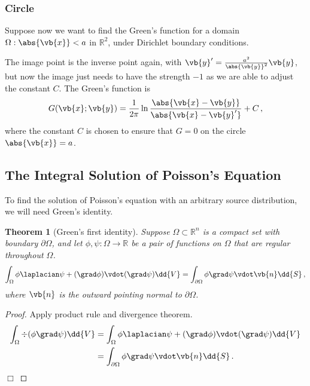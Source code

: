 \documentclass{article}
\theoremstyle{plain}\theoremheaderfont{\normalfont\itshape}\theorembodyfont{\rmfamily}\theoremseparator{.}\newtheorem*{rem}{Remark}\newtheorem*{ex}{Example}\newtheorem*{proof}{Proof}\newtheorem*{altp}{Alternative proof}
\theoremstyle{plain}\theoremheaderfont{\normalfont\bfseries}\theorembodyfont{\rmfamily}\theoremseparator{.}\newtheorem{thm}{Theorem}[section]\newtheorem{lem}[thm]{Lemma}\newtheorem{prop}[thm]{Proposition}\newtheorem*{cor}{Corollary}\newtheorem{defn}[thm]{Definition}\newtheorem{clm}[thm]{Claim}\newtheorem{clminproof}{Claim}
\theoremstyle{break}\theoremheaderfont{\normalfont\itshape}\theorembodyfont{\rmfamily}\theoremseparator{.\medskip}\newtheorem*{proofskip}{Proof}\newtheorem*{exs}{Examples}\newtheorem*{rems}{Remarks}
\theoremstyle{break}\theoremheaderfont{\normalfont\bfseries}\theorembodyfont{\rmfamily}\theoremseparator{.\medskip}\newtheorem{lemskip}[thm]{Lemma}\newtheorem{defnskip}[thm]{Definition}\newtheorem{propskip}[thm]{Proposition}\newtheorem{thmskip}[thm]{Theorem}
\numberwithin{equation}{section}
\newcommand{\qed}{\hfill\ensuremath{\Box}}
\begin{document}
	\subsubsection{Circle}
	Suppose now we want to find the Green's function for a domain \(\Omega:\abs{\vb{x}}<a\) in \(\mathbb{R}^2\), under Dirichlet boundary conditions.

	The image point is the inverse point again, with \(\vb{y}'=\frac{a^2}{\abs{\vb{y}}^2}\vb{y}\), but now the image just needs to have the strength \(-1\) as we are able to adjust the constant \(C\). The Green's function is
	\[G(\vb{x};\vb{y})=\frac{1}{2\pi}\ln\frac{\abs{\vb{x}-\vb{y}}}{\abs{\vb{x}-\vb{y}'}}+C\,,\]
	where the constant \(C\) is chosen to ensure that \(G=0\) on the circle \(\abs{\vb{x}}=a\).

	\subsection{The Integral Solution of Poisson's Equation}
	To find the solution of Poisson's equation with an arbitrary source distribution, we will need Green's identity.

	\begin{thm}[Green's first identity]
		Suppose \(\Omega\subset\mathbb{R}^n\) is a compact set with boundary \(\partial\Omega\), and let \(\phi,\psi:\Omega\to\mathbb{R}\) be a pair of functions on \(\Omega\) that are regular throughout \(\Omega\).
		\[\int_\Omega\phi\laplacian\psi+(\grad\phi)\vdot(\grad\psi)\dd{V}=\int_{\partial\Omega}\phi\grad\psi\vdot\vb{n}\dd{S}\,,\]
		where \(\vb{n}\) is the outward pointing normal to \(\partial\Omega\).
	\end{thm}
	\begin{proof}
		Apply product rule and divergence theorem.
		\begin{align*}
			\int_\Omega\div(\phi\grad\psi)\dd{V}&=\int_\Omega\phi\laplacian\psi+(\grad\phi)\vdot(\grad\psi)\dd{V}\\
			&=\int_{\partial\Omega}\phi\grad\psi\vdot\vb{n}\dd{S}\,.
		\end{align*}\qed
	\end{proof}
\end{document}
